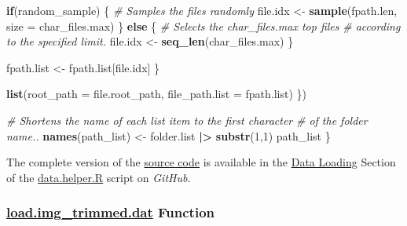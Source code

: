 \documentclass[
]{report}
\newenvironment{Shaded}{\begin{snugshade}}{\end{snugshade}}
\newcommand{\AttributeTok}[1]{\textcolor[rgb]{0.13,0.29,0.53}{#1}}
\newcommand{\CommentTok}[1]{\textcolor[rgb]{0.56,0.35,0.01}{\textit{#1}}}
\newcommand{\ControlFlowTok}[1]{\textcolor[rgb]{0.13,0.29,0.53}{\textbf{#1}}}
\newcommand{\DecValTok}[1]{\textcolor[rgb]{0.00,0.00,0.81}{#1}}
\newcommand{\FunctionTok}[1]{\textcolor[rgb]{0.13,0.29,0.53}{\textbf{#1}}}
\newcommand{\NormalTok}[1]{#1}
\newcommand{\OtherTok}[1]{\textcolor[rgb]{0.56,0.35,0.01}{#1}}
\newcommand{\SpecialCharTok}[1]{\textcolor[rgb]{0.81,0.36,0.00}{\textbf{#1}}}
\begin{document}
\begin{Shaded}
\begin{Highlighting}[]
      
      \ControlFlowTok{if}\NormalTok{(random\_sample) \{}
        \CommentTok{\# Samples the files randomly}
\NormalTok{        file.idx }\OtherTok{\textless{}{-}} \FunctionTok{sample}\NormalTok{(fpath.len, }\AttributeTok{size =}\NormalTok{ char\_files.max)}
\NormalTok{      \} }\ControlFlowTok{else}\NormalTok{ \{}
        \CommentTok{\#\textquotesingle{} Selects the \textasciigrave{}char\_files.max\textasciigrave{} top files }
        \CommentTok{\#\textquotesingle{} according to the specified limit.}
\NormalTok{        file.idx }\OtherTok{\textless{}{-}} \FunctionTok{seq\_len}\NormalTok{(char\_files.max)}
\NormalTok{      \}}
      
\NormalTok{      fpath.list }\OtherTok{\textless{}{-}}\NormalTok{ fpath.list[file.idx]}
\NormalTok{    \}}
    
    \FunctionTok{list}\NormalTok{(}\AttributeTok{root\_path =}\NormalTok{ file.root\_path,}
         \AttributeTok{file\_path.list =}\NormalTok{ fpath.list)}
\NormalTok{  \})}
  
  \CommentTok{\#\textquotesingle{} Shortens the name of each list item to the first character }
  \CommentTok{\#\textquotesingle{} of the folder name..}
  \FunctionTok{names}\NormalTok{(path\_list) }\OtherTok{\textless{}{-}}\NormalTok{ folder.list }\SpecialCharTok{|\textgreater{}} \FunctionTok{substr}\NormalTok{(}\DecValTok{1}\NormalTok{,}\DecValTok{1}\NormalTok{)}
\NormalTok{  path\_list}
\NormalTok{\}}
\end{Highlighting}
\end{Shaded}

\begin{noteblock}
The complete version of the \href{https://github.com/AzKurban-edX-DS/edx.capstone.choose-your-own/blob/main/r/support-functions/data-helper.R\#L}{source code} is available in the \href{https://github.com/AzKurban-edX-DS/edx.capstone.choose-your-own/blob/main/r/support-functions/data-helper.R\#L-L}{Data Loading} Section of the \href{https://github.com/AzKurban-edX-DS/edx.capstone.choose-your-own/blob/main/r/support-functions/data-helper.R\#L}{data.helper.R} script on \emph{GitHub}.

\end{noteblock}

\newpage

\subsubsection{\texorpdfstring{\href{https://github.com/AzKurban-edX-DS/edx.capstone.choose-your-own/blob/main/r/support-functions/data-helper.R\#L}{load.img\_trimmed.dat} Function}{load.img\_trimmed.dat Function}}\label{func.load.img_trimmed.dat}
\end{document}
